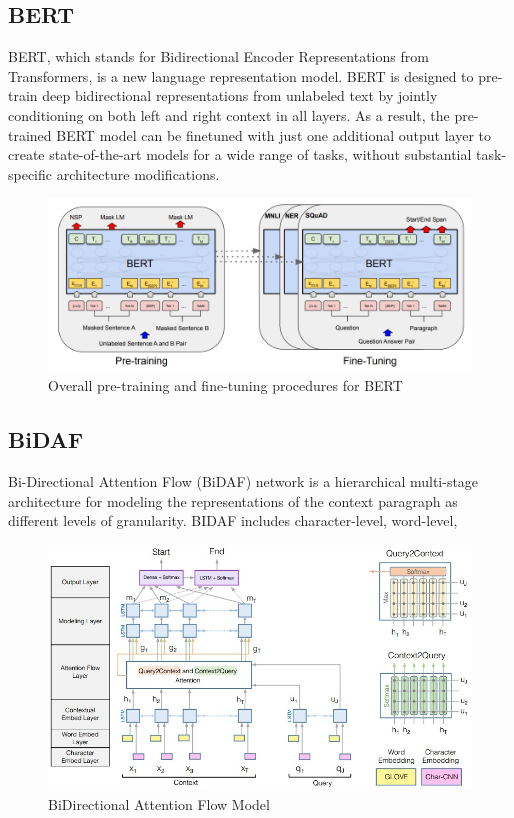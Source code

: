 \documentclass{article}
\begin{document}
\subsection{BERT}
BERT, which stands for Bidirectional Encoder Representations from Transformers, is a new language representation model. BERT is designed to pre-train deep bidirectional representations from unlabeled text by jointly conditioning on both left and right context in all layers. As a result, the pre-trained BERT model can be finetuned with just one additional output layer to create state-of-the-art models for a wide range of tasks, without substantial task-specific architecture modifications.\citet{DBLP:journals/corr/abs-1810-04805}
\begin{figure}[h]
	\centering
	\includegraphics[scale=0.4]{bert.png}
	\caption{Overall pre-training and fine-tuning procedures for BERT}
\end{figure}

\subsection{BiDAF}
Bi-Directional Attention Flow (BiDAF) network is a hierarchical multi-stage architecture for modeling the representations of the context paragraph as different levels of granularity. BIDAF includes character-level, word-level,  \citet{DBLP:journals/corr/SeoKFH16}
\begin{figure}[h]
	\centering
	\includegraphics[scale=0.5]{bidaf.jpg}
	\caption{BiDirectional Attention Flow Model}
\end{figure}
\end{document}
